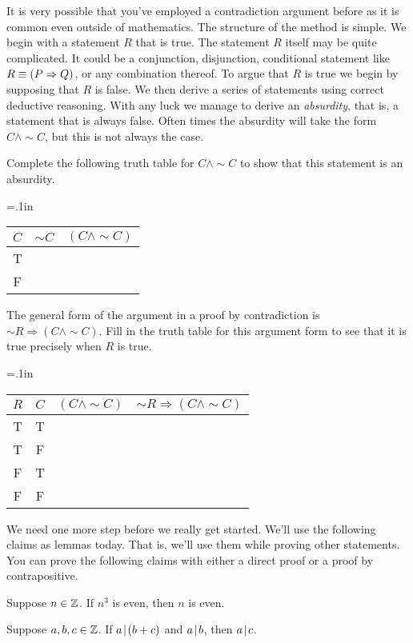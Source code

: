 \noindent It is very possible that you've employed a contradiction argument before as it is common even outside of mathematics.  The structure of the method is simple.  We begin with a statement $R$ that is true.  The statement $R$ itself may be quite complicated.  It could be a conjunction, disjunction, conditional statement like $R \equiv (P \Rightarrow Q)$, or any combination thereof.  To argue that $R$ is true we begin by supposing that $R$ is false.  We then derive a series of statements using correct deductive reasoning.  With any luck we manage to derive an \textit{absurdity}, that is, a statement that is always false.  Often times the absurdity will take the form $C \wedge \sim C$, but this is not always the case.

\begin{question}[resume]
\item Complete the following truth table for $C \wedge \sim C$ to show that this statement is an absurdity.
\begin{center}
	{\tabulinesep=.1in
	\begin{tabu}{c||c|c}
	$C$ & $\sim C$ & $(C \wedge \sim C)$\\
	\hline
	T & \ & \ \\
	F & \ & \ \\
	\end{tabu}}
	\end{center}
	
\item The general form of the argument in a proof by contradiction is $\sim R \Rightarrow (C \wedge \sim C)$.  Fill in the truth table for this argument form to see that it is true precisely when $R$ is true.
\begin{center}
	{\tabulinesep=.1in
	\begin{tabu}{c|c||c|c}
	$R$ & $C$ & $(C \wedge \sim C)$ & $\sim R \Rightarrow (C \wedge \sim C)$\\
	\hline
	T & T & \ & \ \\
	T & F & \ & \ \\
	F & T & \ & \ \\
	F & F & \ & \ \\
	\end{tabu}
	}
	\end{center}
	
\item We need one more step before we really get started.  We'll use the following claims as lemmas today.  That is, we'll use them while proving other statements.  You can prove the following claims with either a direct proof or a proof by contrapositive.
	\begin{claim}  Suppose $n \in \mathbb{Z}$.  If $n^3$ is even, then $n$ is even.
	\end{claim}
	
		\newpage
	
	\begin{claim} Suppose $a,b,c \in \mathbb{Z}$.  If $a \! \mid \! (b+c)$ and $a \! \mid \! b$, then $a \! \mid \! c$.
	\end{claim}
	
\vspace{3in}
\end{question} 


